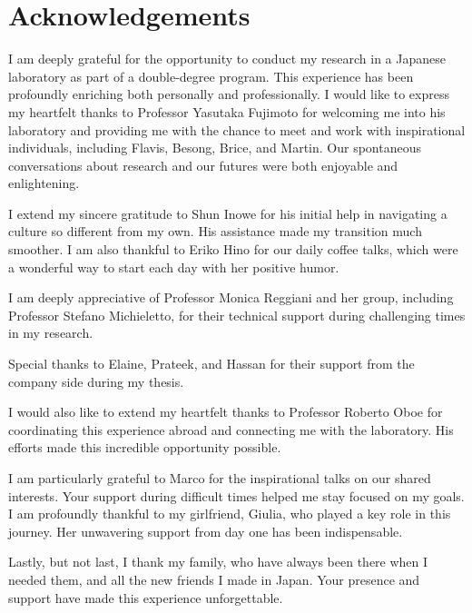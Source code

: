 \thispagestyle{empty}
\section*{Acknowledgements}
\vspace{0.5cm}
I am deeply grateful for the opportunity to conduct my research in a Japanese laboratory as part of a double-degree program. This experience has been profoundly enriching both personally and professionally. I would like to express my heartfelt thanks to Professor Yasutaka Fujimoto for welcoming me into his laboratory and providing me with the chance to meet and work with inspirational individuals, including Flavis, Besong, Brice, and Martin. Our spontaneous conversations about research and our futures were both enjoyable and enlightening.

I extend my sincere gratitude to Shun Inowe for his initial help in navigating a culture so different from my own. His assistance made my transition much smoother. I am also thankful to Eriko Hino for our daily coffee talks, which were a wonderful way to start each day with her positive humor.

I am deeply appreciative of Professor Monica Reggiani and her group, including Professor Stefano Michieletto, for their technical support during challenging times in my research.

Special thanks to Elaine, Prateek, and Hassan for their support from the company side during my thesis.

I would also like to extend my heartfelt thanks to Professor Roberto Oboe for coordinating this experience abroad and connecting me with the laboratory. His efforts made this incredible opportunity possible.

I am particularly grateful to Marco for the inspirational talks on our shared interests. Your support during difficult times helped me stay focused on my goals. I am profoundly thankful to my girlfriend, Giulia, who played a key role in this journey. Her unwavering support from day one has been indispensable.

Lastly, but not last, I thank my family, who have always been there when I needed them, and all the new friends I made in Japan. Your presence and support have made this experience unforgettable.
\afterpage{\blankpage}
